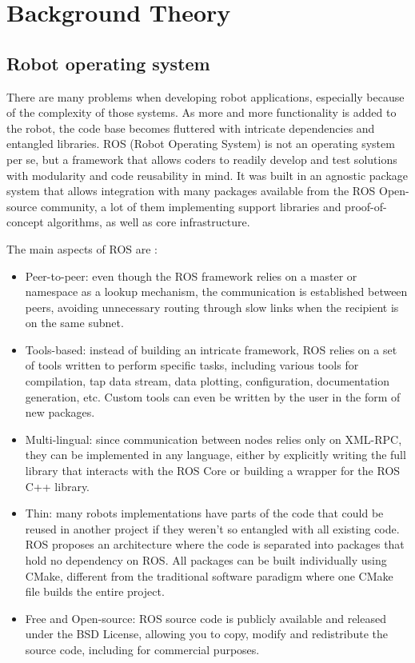 \chapter{Background Theory}\label{chp:fundament}

\section{Robot operating system}

There are many problems when developing robot applications, especially because of the complexity of those systems. As more and more functionality is added to the robot, the code base becomes fluttered with intricate dependencies and entangled libraries. ROS (Robot Operating System) is not an operating system per se, but a framework that allows coders to readily develop and test solutions with modularity and code reusability in mind. It was built in an agnostic package system that allows integration with many packages available from the ROS Open-source community, a lot of them implementing support libraries and proof-of-concept algorithms, as well as core infrastructure.

The main aspects of ROS are \cite{quigley2009ros}:

\begin{itemize}
\item Peer-to-peer: even though the ROS framework relies on a master or namespace as a lookup mechanism, the communication is established between peers, avoiding unnecessary routing through slow links when the recipient is on the same subnet.
\item Tools-based: instead of building an intricate framework, ROS relies on a set of tools written to perform specific tasks, including various tools for compilation, tap data stream, data plotting, configuration, documentation generation, etc. Custom tools can even be written by the user in the form of new packages.
\item Multi-lingual: since communication between nodes relies only on XML-RPC, they can be implemented in any language, either by explicitly writing the full library that interacts with the ROS Core or building a wrapper for the ROS C++ library.
\item Thin: many robots implementations have parts of the code that could be reused in another project if they weren't so entangled with all existing code. ROS proposes an architecture where the code is separated into packages that hold no dependency on ROS. All packages can be built individually using CMake, different from the traditional software paradigm where one CMake file builds the entire project.
\item Free and Open-source: ROS source code is publicly available and released under the BSD License, allowing you to copy, modify and redistribute the source code, including for commercial purposes.
\end{itemize}

